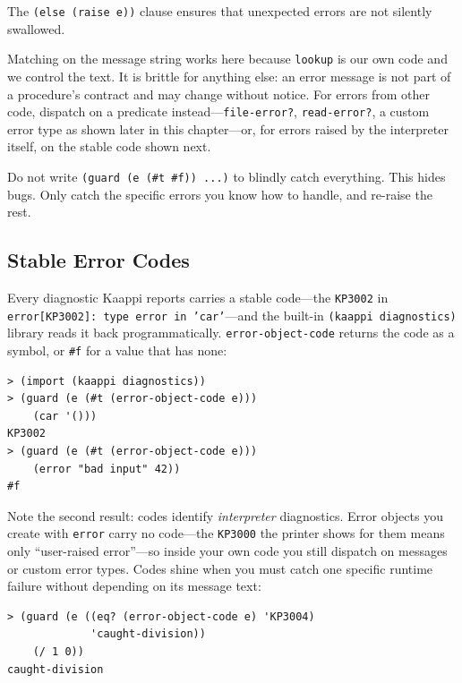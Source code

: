 The \texttt{(else (raise e))} clause ensures that unexpected errors are not silently swallowed.

Matching on the message string works here because \texttt{lookup} is our own code and we control the text. It is brittle for anything else: an error message is not part of a procedure's contract and may change without notice. For errors from other code, dispatch on a predicate instead---\texttt{file-error?}, \texttt{read-error?}, a custom error type as shown later in this chapter---or, for errors raised by the interpreter itself, on the stable code shown next.

\begin{warning}
Do not write \texttt{(guard (e (\#t \#f)) ...)} to blindly catch everything. This hides bugs. Only catch the specific errors you know how to handle, and re-raise the rest.
\end{warning}

\subsection{Stable Error Codes}
\label{sec:error-codes}

Every diagnostic Kaappi reports carries a stable code---the \texttt{KP3002} in \texttt{error[KP3002]: type error in 'car'}---and the built-in \texttt{(kaappi diagnostics)} library reads it back programmatically. \texttt{error-object-code} returns the code as a symbol, or \texttt{\#f} for a value that has none:

\begin{lstlisting}[style=repl]
> (import (kaappi diagnostics))
> (guard (e (#t (error-object-code e)))
    (car '()))
KP3002
> (guard (e (#t (error-object-code e)))
    (error "bad input" 42))
#f
\end{lstlisting}

Note the second result: codes identify \emph{interpreter} diagnostics. Error objects you create with \texttt{error} carry no code---the \texttt{KP3000} the printer shows for them means only ``user-raised error''---so inside your own code you still dispatch on messages or custom error types. Codes shine when you must catch one specific runtime failure without depending on its message text:

\begin{lstlisting}[style=repl]
> (guard (e ((eq? (error-object-code e) 'KP3004)
             'caught-division))
    (/ 1 0))
caught-division
\end{lstlisting}

